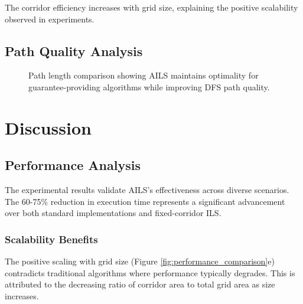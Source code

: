 \documentclass[journal]{IEEEtran}
\begin{document}
The corridor efficiency increases with grid size, explaining the positive scalability observed in experiments.

\subsection{Path Quality Analysis}

\begin{figure}[h]
\centering
{}
\caption{Path length comparison showing AILS maintains optimality for guarantee-providing algorithms while improving DFS path quality.}
\label{fig:path_quality}
\end{figure}

\section{Discussion}

\subsection{Performance Analysis}

The experimental results validate AILS's effectiveness across diverse scenarios. The 60-75\% reduction in execution time represents a significant advancement over both standard implementations and fixed-corridor ILS.

\subsubsection{Scalability Benefits}
The positive scaling with grid size (Figure \ref{fig:performance_comparison}e) contradicts traditional algorithms where performance typically degrades. This is attributed to the decreasing ratio of corridor area to total grid area as size increases.
\end{document}

